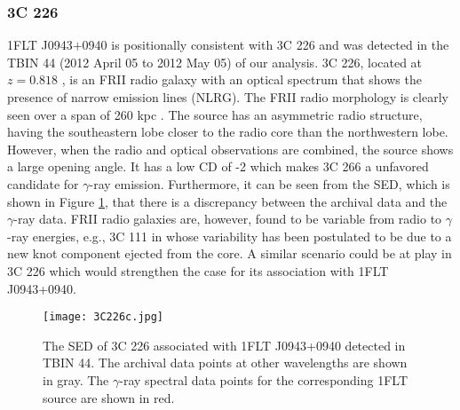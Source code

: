 \documentclass{aastex62}
\begin{document}
\subsubsection{3C 226}
1FLT J0943$+$0940 is positionally consistent with 3C 226 and was detected in the TBIN 44 (2012 April 05 to 2012  May 05) of our analysis. 3C 226, located at $z=0.818$ \citep[][]{hewitt1991optical}, is an FRII radio galaxy \citep{laing1983bright} with an optical spectrum that shows the presence of narrow emission lines (NLRG). The FRII radio morphology is clearly seen over a span of 260 kpc \citep{best1997hst}. The source has an asymmetric radio structure, having the southeastern lobe closer to the radio core than the northwestern lobe. However, when the radio and optical observations are combined, the source shows a large opening angle. It has a  low CD of -2 which makes 3C 266 a unfavored candidate for $\gamma$-ray emission. Furthermore, it can be seen from the SED, which is shown in Figure \ref{figure:3C226}, that there is a discrepancy between the archival data and the $\gamma$-ray data. FRII radio galaxies are, however, found to be variable from radio to $\gamma$-ray energies, e.g., 3C 111 in \citet{grandi2012gamma} whose variability has been postulated to be due to a new knot component ejected from the core. A similar scenario could be at play in 3C 226 which would strengthen the case for its association with 1FLT J0943+0940.
\begin{figure}[hbt!]
    \centering
   \texttt{[image: 3C226c.jpg]}
\caption{The SED of 3C 226 associated with 1FLT J0943+0940 detected in TBIN 44. The archival data points at other wavelengths are shown in gray. The $\gamma$-ray spectral data points for the corresponding 1FLT source are shown in red.}
    \label{figure:3C226}
\end{figure}
\end{document}
